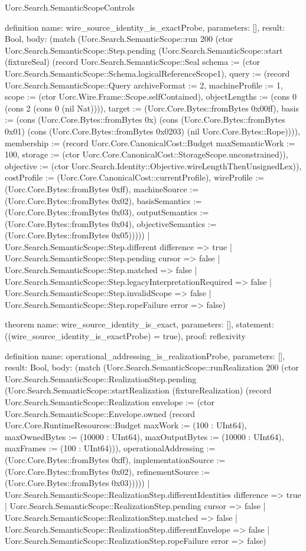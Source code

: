\begin{lexlean}{Uorc.Search.SemanticScopeControls}
\begin{semanticmodule}
definition{
  name: wire_source_identity_is_exactProbe,
  parameters: [],
  result: Bool,
  body: (match (Uorc.Search.SemanticScope::run 200 (ctor Uorc.Search.SemanticScope::Step.pending (Uorc.Search.SemanticScope::start (fixtureSeal) (record Uorc.Search.SemanticScope::Seal {schema := (ctor Uorc.Search.SemanticScope::Schema.logicalReferenceScope1), query := (record Uorc.Search.SemanticScope::Query {archiveFormat := 2, machineProfile := 1, scope := (ctor Uorc.Wire.Frame::Scope.selfContained), objectLengths := (cons 0 (cons 2 (cons 0 (nil Nat)))), target := (Uorc.Core.Bytes::fromBytes 0x00ff), basis := (cons (Uorc.Core.Bytes::fromBytes 0x) (cons (Uorc.Core.Bytes::fromBytes 0x01) (cons (Uorc.Core.Bytes::fromBytes 0x0203) (nil Uorc.Core.Bytes::Rope)))), membership := (record Uorc.Core.CanonicalCost::Budget {maxSemanticWork := 100, storage := (ctor Uorc.Core.CanonicalCost::StorageScope.unconstrained)}), objective := (ctor Uorc.Search.Identity::Objective.wireLengthThenUnsignedLex)}), costProfile := (Uorc.Core.CanonicalCost::currentProfile), wireProfile := (Uorc.Core.Bytes::fromBytes 0xff), machineSource := (Uorc.Core.Bytes::fromBytes 0x02), basisSemantics := (Uorc.Core.Bytes::fromBytes 0x03), outputSemantics := (Uorc.Core.Bytes::fromBytes 0x04), objectiveSemantics := (Uorc.Core.Bytes::fromBytes 0x05)}))))
    | Uorc.Search.SemanticScope::Step.different difference => true
    | Uorc.Search.SemanticScope::Step.pending cursor => false
    | Uorc.Search.SemanticScope::Step.matched => false
    | Uorc.Search.SemanticScope::Step.legacyInterpretationRequired => false
    | Uorc.Search.SemanticScope::Step.invalidScope => false
    | Uorc.Search.SemanticScope::Step.ropeFailure error => false)
}

theorem{
  name: wire_source_identity_is_exact,
  parameters: [],
  statement: ((wire_source_identity_is_exactProbe) = true),
  proof: reflexivity{}
}

definition{
  name: operational_addressing_is_realizationProbe,
  parameters: [],
  result: Bool,
  body: (match (Uorc.Search.SemanticScope::runRealization 200 (ctor Uorc.Search.SemanticScope::RealizationStep.pending (Uorc.Search.SemanticScope::startRealization (fixtureRealization) (record Uorc.Search.SemanticScope::Realization {envelope := (ctor Uorc.Search.SemanticScope::Envelope.owned (record Uorc.Core.RuntimeResources::Budget {maxWork := (100 : UInt64), maxOwnedBytes := (10000 : UInt64), maxOutputBytes := (10000 : UInt64), maxFrames := (100 : UInt64)})), operationalAddressing := (Uorc.Core.Bytes::fromBytes 0xff), implementationSource := (Uorc.Core.Bytes::fromBytes 0x02), refinementSource := (Uorc.Core.Bytes::fromBytes 0x03)}))))
    | Uorc.Search.SemanticScope::RealizationStep.differentIdentities difference => true
    | Uorc.Search.SemanticScope::RealizationStep.pending cursor => false
    | Uorc.Search.SemanticScope::RealizationStep.matched => false
    | Uorc.Search.SemanticScope::RealizationStep.differentEnvelope => false
    | Uorc.Search.SemanticScope::RealizationStep.ropeFailure error => false)
}


\end{semanticmodule}
\end{lexlean}
